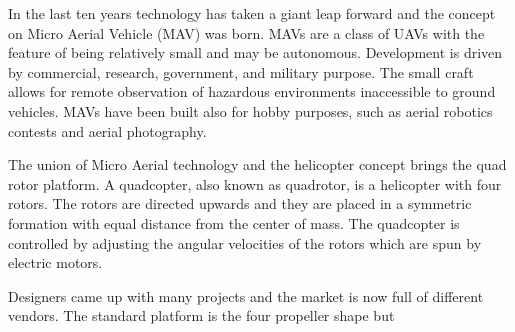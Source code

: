 \noindent
In the last ten years technology has taken a giant leap forward and the concept on Micro Aerial Vehicle (MAV) was born. MAVs are a class of UAVs with the feature of being relatively small and may be autonomous. Development is driven by commercial, research, government, and military purpose. The small craft allows for remote observation of hazardous environments inaccessible to ground vehicles. MAVs have been built also for hobby purposes, such as aerial robotics contests and aerial photography.\par The union of Micro Aerial technology and the helicopter concept brings the quad rotor platform. A quadcopter, also known as quadrotor, is a helicopter with four rotors. The rotors are directed upwards and they are placed in a symmetric formation with equal distance from the center of mass. The quadcopter is controlled by adjusting the angular velocities of the rotors which are spun by electric motors.\par Designers came up with many projects and the market is now full of different vendors. The standard platform is the four propeller shape but
